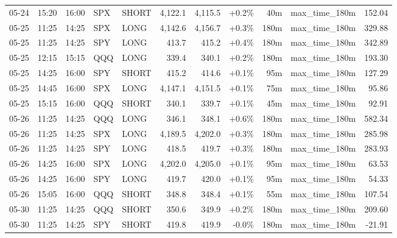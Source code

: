 \documentclass[11pt,a4paper,twoside]{article}
\begin{document}
\begin{center}
\begin{longtable}{>{\color{txtmain}}l l l l l r r r r >{\color{txtmain}}l r}
05-24 & 15:20 & 16:00 & SPX & SHORT & 4,122.1 & 4,115.5 & \textcolor{wingreen}{+0.2\%} & 40m & max\_time\_180m & \textcolor{wingreen}{152.04} \\
05-25 & 11:25 & 14:25 & SPX & LONG & 4,142.6 & 4,156.7 & \textcolor{wingreen}{+0.3\%} & 180m & max\_time\_180m & \textcolor{wingreen}{329.88} \\
05-25 & 11:25 & 14:25 & SPY & LONG & 413.7 & 415.2 & \textcolor{wingreen}{+0.4\%} & 180m & max\_time\_180m & \textcolor{wingreen}{342.89} \\
05-25 & 12:15 & 15:15 & QQQ & LONG & 339.4 & 340.1 & \textcolor{wingreen}{+0.2\%} & 180m & max\_time\_180m & \textcolor{wingreen}{193.30} \\
05-25 & 14:25 & 16:00 & SPY & SHORT & 415.2 & 414.6 & \textcolor{wingreen}{+0.1\%} & 95m & max\_time\_180m & \textcolor{wingreen}{127.29} \\
05-25 & 14:45 & 16:00 & SPX & LONG & 4,147.1 & 4,151.5 & \textcolor{wingreen}{+0.1\%} & 75m & max\_time\_180m & \textcolor{wingreen}{95.86} \\
05-25 & 15:15 & 16:00 & QQQ & SHORT & 340.1 & 339.7 & \textcolor{wingreen}{+0.1\%} & 45m & max\_time\_180m & \textcolor{wingreen}{92.91} \\
05-26 & 11:25 & 14:25 & QQQ & LONG & 346.1 & 348.1 & \textcolor{wingreen}{+0.6\%} & 180m & max\_time\_180m & \textcolor{wingreen}{582.34} \\
05-26 & 11:25 & 14:25 & SPX & LONG & 4,189.5 & 4,202.0 & \textcolor{wingreen}{+0.3\%} & 180m & max\_time\_180m & \textcolor{wingreen}{285.98} \\
05-26 & 11:25 & 14:25 & SPY & LONG & 418.5 & 419.7 & \textcolor{wingreen}{+0.3\%} & 180m & max\_time\_180m & \textcolor{wingreen}{283.93} \\
05-26 & 14:25 & 16:00 & SPX & LONG & 4,202.0 & 4,205.0 & \textcolor{wingreen}{+0.1\%} & 95m & max\_time\_180m & \textcolor{wingreen}{63.53} \\
05-26 & 14:25 & 16:00 & SPY & LONG & 419.7 & 420.0 & \textcolor{wingreen}{+0.1\%} & 95m & max\_time\_180m & \textcolor{wingreen}{54.33} \\
05-26 & 15:05 & 16:00 & QQQ & SHORT & 348.8 & 348.4 & \textcolor{wingreen}{+0.1\%} & 55m & max\_time\_180m & \textcolor{wingreen}{107.54} \\
05-30 & 11:25 & 14:25 & QQQ & SHORT & 350.6 & 349.9 & \textcolor{wingreen}{+0.2\%} & 180m & max\_time\_180m & \textcolor{wingreen}{209.60} \\
05-30 & 11:25 & 14:25 & SPY & SHORT & 419.8 & 419.9 & \textcolor{lossred}{-0.0\%} & 180m & max\_time\_180m & \textcolor{lossred}{-21.91} \\

\end{longtable}
\end{center}
\end{document}
